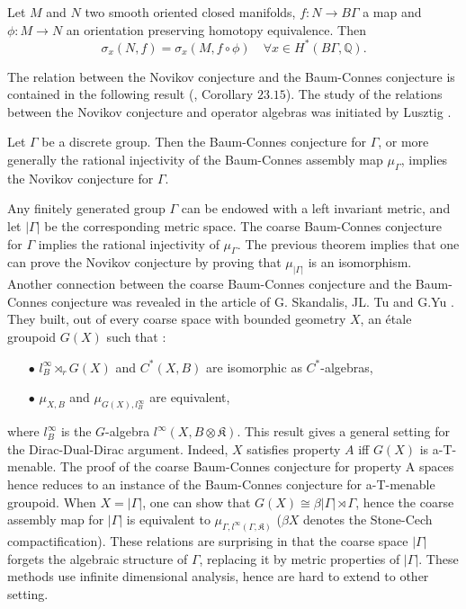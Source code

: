 \begin{conj}[Novikov]\label{Novikov}
Let $M$ and $N$ two smooth oriented closed manifolds, $f: N\rightarrow B\Gamma$ a map and $\phi : M\rightarrow N$ an orientation preserving homotopy equivalence. Then 
\[\sigma_x(N,f)= \sigma_x(M,f\circ\phi )\quad \forall x\in H^*(B\Gamma,\mathbb Q).\]
\end{conj}

The relation between the Novikov conjecture and the Baum-Connes conjecture is contained in the following result (\cite{kreckluck}, Corollary $23.15$). The study of the relations between the Novikov conjecture and operator algebras was initiated by Lusztig \cite{lusztig}. 

\begin{thm}
Let $\Gamma$ be a discrete group. Then the Baum-Connes conjecture for $\Gamma$, or more generally the rational injectivity of the Baum-Connes assembly map $\mu_\Gamma$, implies the Novikov conjecture for $\Gamma$.
\end{thm}

Any finitely generated group $\Gamma$ can be endowed with a left invariant metric, and let $|\Gamma|$ be the corresponding metric space. The coarse Baum-Connes conjecture for $\Gamma$ implies the rational injectivity of $\mu_\Gamma$. The previous theorem implies that one can prove the Novikov conjecture by proving that $\mu_{|\Gamma|}$ is an isomorphism. \\

Another connection between the coarse Baum-Connes conjecture and the Baum-Connes conjecture was revealed in the article of G. Skandalis, JL. Tu and G.Yu \cite{SkTuYu}. They built, out of every coarse space with bounded geometry $X$, an étale groupoid $G(X)$ such that :\\
\begin{itemize}
\item[$\bullet$] $l^\infty_B \rtimes_r G(X)$ and $C^*(X,B)$ are isomorphic as $C^*$-algebras,
\item[$\bullet$] $\mu_{X,B}$ and $\mu_{G(X),l^\infty_B}$ are equivalent,\\
\end{itemize}
where $l^\infty_B$ is the $G$-algebra $l^\infty(X,B\otimes\mathfrak K)$. This result gives a general setting for the Dirac-Dual-Dirac argument. Indeed, $X$ satisfies property $A$ iff $G(X)$ is a-T-menable. The proof of the coarse Baum-Connes conjecture for property A spaces hence reduces to an instance of the Baum-Connes conjecture for a-T-menable groupoid. When $X=|\Gamma|$, one can show that $G(X) \cong \beta |\Gamma| \rtimes \Gamma$, hence the coarse assembly map for $|\Gamma|$ is equivalent to $\mu_{\Gamma,l^\infty(\Gamma, \mathfrak K)}$ \cite{SkTuYu} ($\beta X$ denotes the Stone-Cech compactification). These relations are surprising in that the coarse space $|\Gamma|$ forgets the algebraic structure of $\Gamma$, replacing it by metric properties of $|\Gamma|$. These methods use infinite dimensional analysis, hence are hard to extend to other setting. %

